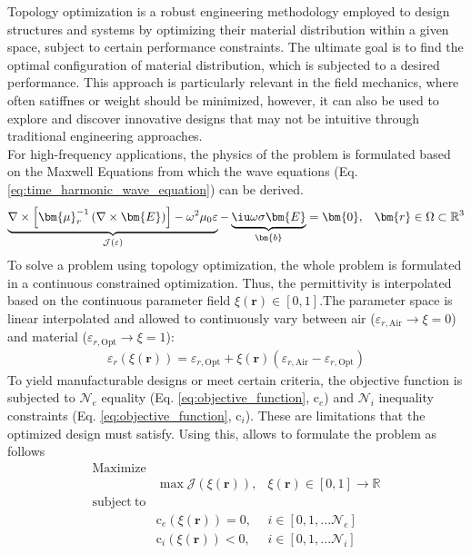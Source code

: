 Topology optimization is a robust engineering methodology employed to design structures and systems by optimizing their material distribution within a given space, subject to certain performance constraints. 
      The ultimate goal is to find the optimal configuration of material distribution, which is subjected to a desired performance.  This approach is particularly relevant in the field mechanics, where often satiffnes or weight should be minimized, however, it can also be used to explore and discover innovative designs that may not be intuitive through traditional engineering approaches.\\
      For high-frequency applications, the physics of the problem is formulated based on the Maxwell Equations from which the wave equations (Eq. \ref{eq:time_harmonic_wave_equation}) can be derived. 
        \begin{equation}
          \begin{aligned}   
            \underbrace{
            \nabla \times \left[ \bm{\mu}_r^{-1} \left ( \nabla \times \bm{E} \right ) \right]
            -\omega^2\mu_0\varepsilon }_{\mathcal{J}(\varepsilon)}  - \underbrace{\iu \omega \sigma \bm{E}}_{\bm{b}} &= \bm{0}, & \bm{r} \in \Omega \subset \mathbb{R}^3
            \label{eq:time_harmonic_wave_equation}
        \end{aligned}
        \end{equation}
        To solve a problem using topology optimization, the whole problem is formulated in a continuous constrained optimization. Thus, the permittivity is interpolated based on the continuous parameter field 
        $\xi(\bm{r}) \in [0, 1]$.The parameter space is linear interpolated and allowed to continuously vary between air ($\varepsilon_{r,  \mathrm{Air}} \rightarrow \xi=0$) and material ($\varepsilon_{r, \mathrm{Opt}} \rightarrow \xi=1$):
    \begin{align}
        \varepsilon_r(\xi(\bm{r})) = \varepsilon_{r, \mathrm{Opt}} + \xi(\bm{r})\left ( \varepsilon_{r, \mathrm{Air}} - \varepsilon_{r, \mathrm{Opt}} \right )
    \end{align}
    To yield manufacturable designs or meet certain criteria, the objective function is subjected to $\mathcal{N}_e$ equality (Eq. \ref{eq:objective_function},  $\mathrm{c}_e$) and $\mathcal{N}_i$ inequality constraints (Eq. \ref{eq:objective_function},  $\mathrm{c}_i$). These are limitations that the optimized design must satisfy. Using this, allows to formulate the problem as follows
     \begin{equation}
     \begin{aligned}
       \mathrm{Maximize} &  &\\
        & \max \mathcal{J}(\xi(\bm{r})), &\xi(\bm{r}) \in [0, 1] \rightarrow \mathbb{R}\\
        \mathrm{subject~to} &  &\\
        & \mathrm{c}_e(\xi(\bm{r})) = 0, & i \in [0, 1, ... \mathcal{N}_e]\\
        & \mathrm{c}_i(\xi(\bm{r})) < 0, & i \in [0, 1, ... \mathcal{N}_i]\\
    \end{aligned}
    \label{eq:objective_function}
    \end{equation}

